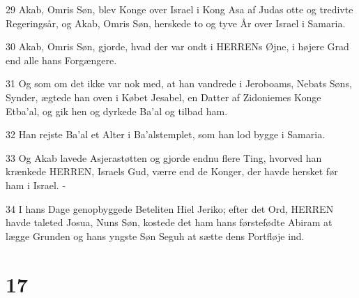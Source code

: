 \par 29 Akab, Omris Søn, blev Konge over Israel i Kong Asa af Judas otte og tredivte Regeringsår, og Akab, Omris Søn, herskede to og tyve År over Israel i Samaria.
\par 30 Akab, Omris Søn, gjorde, hvad der var ondt i HERRENs Øjne, i højere Grad end alle hans Forgængere.
\par 31 Og som om det ikke var nok med, at han vandrede i Jeroboams, Nebats Søns, Synder, ægtede han oven i Købet Jesabel, en Datter af Zidoniemes Konge Etba'al, og gik hen og dyrkede Ba'al og tilbad ham.
\par 32 Han rejste Ba'al et Alter i Ba'alstemplet, som han lod bygge i Samaria.
\par 33 Og Akab lavede Asjerastøtten og gjorde endnu flere Ting, hvorved han krænkede HERREN, Israels Gud, værre end de Konger, der havde hersket før ham i Israel. -
\par 34 I hans Dage genopbyggede Beteliten Hiel Jeriko; efter det Ord, HERREN havde taleted Josua, Nuns Søn, kostede det ham hans førstefødte Abiram at lægge Grunden og hans yngste Søn Seguh at sætte dens Portfløje ind.

\chapter{17}

